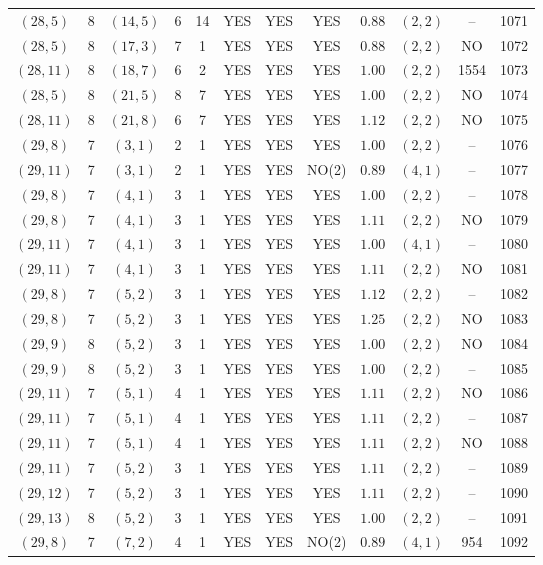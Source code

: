\begin{longtable}{|c|c|c|c|c|c|c|c|c|c|c|c|}
$(28,5)$ & 8 & $(14,5)$ & 6 & 14 & YES & YES & YES & $0.88$ & $(2,2)$ & -- & 1071\\
$(28,5)$ & 8 & $(17,3)$ & 7 & 1 & YES & YES & YES & $0.88$ & $(2,2)$ & NO & 1072\\
$(28,11)$ & 8 & $(18,7)$ & 6 & 2 & YES & YES & YES & $1.00$ & $(2,2)$ & 1554 & 1073\\
$(28,5)$ & 8 & $(21,5)$ & 8 & 7 & YES & YES & YES & $1.00$ & $(2,2)$ & NO & 1074\\
$(28,11)$ & 8 & $(21,8)$ & 6 & 7 & YES & YES & YES & $1.12$ & $(2,2)$ & NO & 1075\\
$(29,8)$ & 7 & $(3,1)$ & 2 & 1 & YES & YES & YES & $1.00$ & $(2,2)$ & -- & 1076\\
$(29,11)$ & 7 & $(3,1)$ & 2 & 1 & YES & YES & NO(2) & $0.89$ & $(4,1)$ & -- & 1077\\
$(29,8)$ & 7 & $(4,1)$ & 3 & 1 & YES & YES & YES & $1.00$ & $(2,2)$ & -- & 1078\\
$(29,8)$ & 7 & $(4,1)$ & 3 & 1 & YES & YES & YES & $1.11$ & $(2,2)$ & NO & 1079\\
$(29,11)$ & 7 & $(4,1)$ & 3 & 1 & YES & YES & YES & $1.00$ & $(4,1)$ & -- & 1080\\
$(29,11)$ & 7 & $(4,1)$ & 3 & 1 & YES & YES & YES & $1.11$ & $(2,2)$ & NO & 1081\\
$(29,8)$ & 7 & $(5,2)$ & 3 & 1 & YES & YES & YES & $1.12$ & $(2,2)$ & -- & 1082\\
$(29,8)$ & 7 & $(5,2)$ & 3 & 1 & YES & YES & YES & $1.25$ & $(2,2)$ & NO & 1083\\
$(29,9)$ & 8 & $(5,2)$ & 3 & 1 & YES & YES & YES & $1.00$ & $(2,2)$ & NO & 1084\\
$(29,9)$ & 8 & $(5,2)$ & 3 & 1 & YES & YES & YES & $1.00$ & $(2,2)$ & -- & 1085\\
$(29,11)$ & 7 & $(5,1)$ & 4 & 1 & YES & YES & YES & $1.11$ & $(2,2)$ & NO & 1086\\
$(29,11)$ & 7 & $(5,1)$ & 4 & 1 & YES & YES & YES & $1.11$ & $(2,2)$ & -- & 1087\\
$(29,11)$ & 7 & $(5,1)$ & 4 & 1 & YES & YES & YES & $1.11$ & $(2,2)$ & NO & 1088\\
$(29,11)$ & 7 & $(5,2)$ & 3 & 1 & YES & YES & YES & $1.11$ & $(2,2)$ & -- & 1089\\
$(29,12)$ & 7 & $(5,2)$ & 3 & 1 & YES & YES & YES & $1.11$ & $(2,2)$ & -- & 1090\\
$(29,13)$ & 8 & $(5,2)$ & 3 & 1 & YES & YES & YES & $1.00$ & $(2,2)$ & -- & 1091\\
$(29,8)$ & 7 & $(7,2)$ & 4 & 1 & YES & YES & NO(2) & $0.89$ & $(4,1)$ & 954 & 1092\\

\end{longtable}
